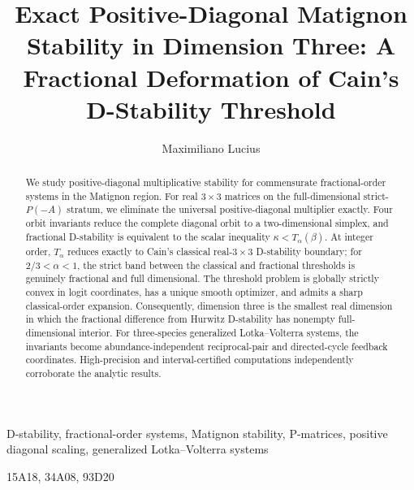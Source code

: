 \documentclass[hidelinks]{siamart251216}
\title{Exact Positive-Diagonal Matignon Stability in Dimension Three:
A Fractional Deformation of Cain's D-Stability Threshold}
\author{Maximiliano Lucius}
\begin{document}
\maketitle

\begin{abstract}
We study positive-diagonal multiplicative stability for commensurate fractional-order systems in the Matignon region. For real \(3\times3\) matrices on the full-dimensional strict-\(P(-A)\) stratum, we eliminate the universal positive-diagonal multiplier exactly. Four orbit invariants reduce the complete diagonal orbit to a two-dimensional simplex, and fractional D-stability is equivalent to the scalar inequality \(\kappa<T_\alpha(\beta)\). At integer order, \(T_\alpha\) reduces exactly to Cain's classical real-\(3\times3\) D-stability boundary; for \(2/3<\alpha<1\), the strict band between the classical and fractional thresholds is genuinely fractional and full dimensional. The threshold problem is globally strictly convex in logit coordinates, has a unique smooth optimizer, and admits a sharp classical-order expansion. Consequently, dimension three is the smallest real dimension in which the fractional difference from Hurwitz D-stability has nonempty full-dimensional interior. For three-species generalized Lotka--Volterra systems, the invariants become abundance-independent reciprocal-pair and directed-cycle feedback coordinates. High-precision and interval-certified computations independently corroborate the analytic results.
\end{abstract}

\begin{keywords}
D-stability, fractional-order systems, Matignon stability, P-matrices, positive diagonal scaling, generalized Lotka--Volterra systems
\end{keywords}

\begin{MSCcodes}
15A18, 34A08, 93D20
\end{MSCcodes}














\end{document}
